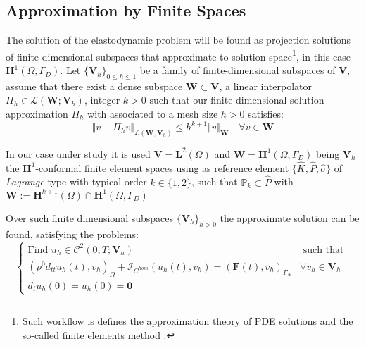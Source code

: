 \subsection{Approximation by Finite Spaces}
The solution of the elastodynamic problem will be found as projection solutions of finite dimensional subspaces that approximate to solution space\footnote{Such workflow is defines the approximation theory of PDE solutions and the so-called finite elements method \cite{ern2004theory}.}, in this case $\mathbf{H}^1(\Omega, \Gamma_D)$.
Let $\{\mathbf{V}_h \}_{0 \leq h \leq 1}$ be a family of finite-dimensional subspaces of $\mathbf{V}$, assume that there exist a dense subspace $\mathbf{W} \subset \mathbf{V}$, a linear interpolator $\Pi_h \in \mathcal{L}(\mathbf{W};\mathbf{V}_h)$, integer $k > 0$ such that our finite dimensional solution approximation $\Pi_{h} $ with associated to a mesh size $h>0$ satisfies:
\begin{equation*}
    \Vert v - \Pi_h v \Vert_{\mathcal{L}(\mathbf{W};\mathbf{V}_h)} \leq h^{k+1} \Vert v \Vert_{\mathbf{W}} \quad \forall v \in \mathbf{W}
\end{equation*}
\begin{rem}
In our case under study it is used $\mathbf{V} = \mathbf{L}^2(\Omega)$ and $\mathbf{W} = \mathbf{H}^1(\Omega, \Gamma_D)$ being $\mathbf{V}_h$ the $\mathbf{H}^1$-conformal finite element spaces using as reference element $\{ \hat{K}, \hat{P}, \hat{\sigma} \}$ of \textit{Lagrange} type with typical order $k \in \{1,2\}$, such that $\mathbb{P}_k \subset \hat{P}$ with $\mathbf{W} := \mathbf{H}^{k+1}(\Omega) \cap \mathbf{H}^1(\Omega, \Gamma_D)$
\end{rem}

Over such finite dimensional subspaces $\{ \mathbf{V}_h\}_{h>0}$ the approximate solution can be found, satisfying the problems:
\begin{equation}
\label{ODE-Discretized}
    \left \{
    \begin{array}{cc}
        \text{Find } u_h \in \mathcal{C}^2(0,T; \mathbf{V}_h) & \text{ such that } \\
        (\rho^0 d_{tt} u_h(t), v_h)_{\Omega} + \mathcal{I}_{C^{hom}}(u_h(t), v_h) = (\mathbf{F}(t), v_h)_{\Gamma_N} & \forall v_h \in \mathbf{V}_h\\
        d_t u_h(0) = u_h(0) = \mathbf{0} & 
    \end{array}
    \right. 
\end{equation}

